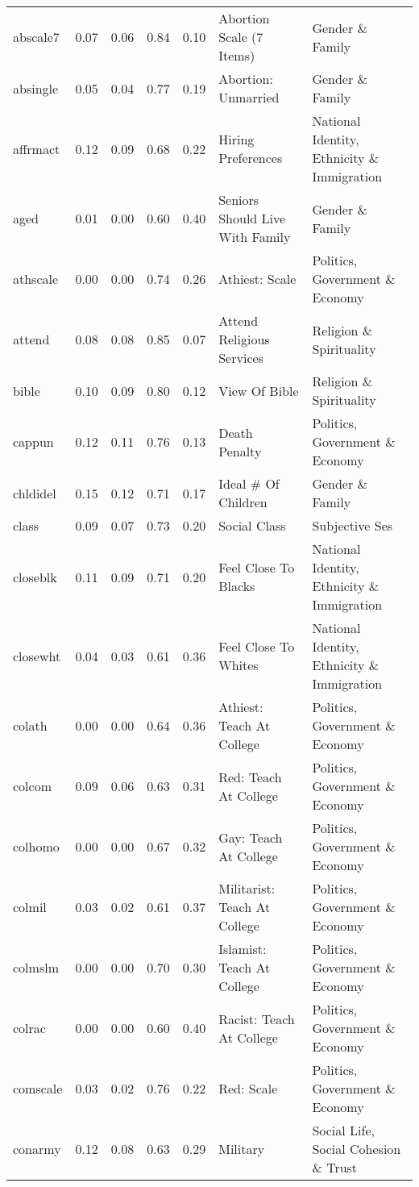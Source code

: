 \documentclass[
  12pt,
]{article}
\begin{document}
\begin{landscape}
\begin{scriptsize}
\begin{longtable}{|p{1.75in}|p{0.3in}|p{0.3in}|p{0.3in}|p{0.3in}|p{2.5in}|p{2.5in}}
abscale7 & 0.07 & 0.06 & 0.84 & 0.10 & Abortion Scale (7 Items) & Gender \& Family \\ 
absingle & 0.05 & 0.04 & 0.77 & 0.19 & Abortion: Unmarried & Gender \& Family \\ 
affrmact & 0.12 & 0.09 & 0.68 & 0.22 & Hiring Preferences & National Identity, Ethnicity \& Immigration \\ 
aged & 0.01 & 0.00 & 0.60 & 0.40 & Seniors Should Live With Family & Gender \& Family \\ 
athscale & 0.00 & 0.00 & 0.74 & 0.26 & Athiest: Scale & Politics, Government \& Economy \\ 
attend & 0.08 & 0.08 & 0.85 & 0.07 & Attend Religious Services & Religion \& Spirituality \\ 
bible & 0.10 & 0.09 & 0.80 & 0.12 & View Of Bible & Religion \& Spirituality \\ 
cappun & 0.12 & 0.11 & 0.76 & 0.13 & Death Penalty & Politics, Government \& Economy \\ 
chldidel & 0.15 & 0.12 & 0.71 & 0.17 & Ideal \# Of Children & Gender \& Family \\ 
class & 0.09 & 0.07 & 0.73 & 0.20 & Social Class & Subjective Ses \\ 
closeblk & 0.11 & 0.09 & 0.71 & 0.20 & Feel Close To Blacks & National Identity, Ethnicity \& Immigration \\ 
closewht & 0.04 & 0.03 & 0.61 & 0.36 & Feel Close To Whites & National Identity, Ethnicity \& Immigration \\ 
colath & 0.00 & 0.00 & 0.64 & 0.36 & Athiest: Teach At College & Politics, Government \& Economy \\ 
colcom & 0.09 & 0.06 & 0.63 & 0.31 & Red: Teach At College & Politics, Government \& Economy \\ 
colhomo & 0.00 & 0.00 & 0.67 & 0.32 & Gay: Teach At College & Politics, Government \& Economy \\ 
colmil & 0.03 & 0.02 & 0.61 & 0.37 & Militarist: Teach At College & Politics, Government \& Economy \\ 
colmslm & 0.00 & 0.00 & 0.70 & 0.30 & Islamist: Teach At College & Politics, Government \& Economy \\ 
colrac & 0.00 & 0.00 & 0.60 & 0.40 & Racist: Teach At College & Politics, Government \& Economy \\ 
comscale & 0.03 & 0.02 & 0.76 & 0.22 & Red: Scale & Politics, Government \& Economy \\ 
conarmy & 0.12 & 0.08 & 0.63 & 0.29 & Military & Social Life, Social Cohesion \& Trust \\ 

\end{longtable}
\end{scriptsize}
\end{landscape}
\end{document}
